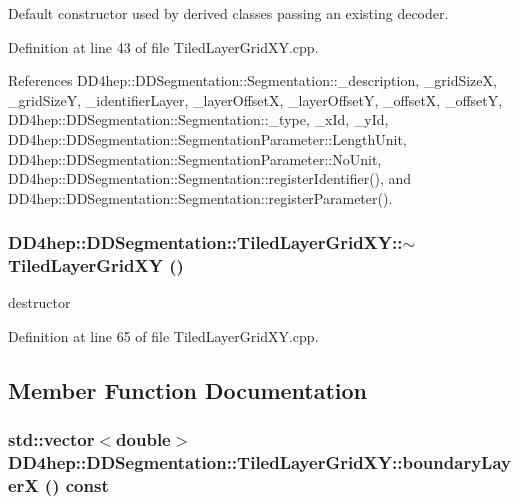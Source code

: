 Default constructor used by derived classes passing an existing decoder. 

Definition at line 43 of file TiledLayerGridXY.cpp.

References DD4hep::DDSegmentation::Segmentation::\_\-description, \_\-gridSizeX, \_\-gridSizeY, \_\-identifierLayer, \_\-layerOffsetX, \_\-layerOffsetY, \_\-offsetX, \_\-offsetY, DD4hep::DDSegmentation::Segmentation::\_\-type, \_\-xId, \_\-yId, DD4hep::DDSegmentation::SegmentationParameter::LengthUnit, DD4hep::DDSegmentation::SegmentationParameter::NoUnit, DD4hep::DDSegmentation::Segmentation::registerIdentifier(), and DD4hep::DDSegmentation::Segmentation::registerParameter().\hypertarget{class_d_d4hep_1_1_d_d_segmentation_1_1_tiled_layer_grid_x_y_a03eeb88ffc324d56f3bfac3abb707e62}{
\subsubsection[{$\sim$TiledLayerGridXY}]{\setlength{\rightskip}{0pt plus 5cm}DD4hep::DDSegmentation::TiledLayerGridXY::$\sim$TiledLayerGridXY ()}}
\label{class_d_d4hep_1_1_d_d_segmentation_1_1_tiled_layer_grid_x_y_a03eeb88ffc324d56f3bfac3abb707e62}


destructor 

Definition at line 65 of file TiledLayerGridXY.cpp.

\subsection{Member Function Documentation}
\hypertarget{class_d_d4hep_1_1_d_d_segmentation_1_1_tiled_layer_grid_x_y_a5302fa68f6d9dde47079504b6ce4608d}{
\subsubsection[{boundaryLayerX}]{\setlength{\rightskip}{0pt plus 5cm}std::vector$<$double$>$ DD4hep::DDSegmentation::TiledLayerGridXY::boundaryLayerX () const}}
\label{class_d_d4hep_1_1_d_d_segmentation_1_1_tiled_layer_grid_x_y_a5302fa68f6d9dde47079504b6ce4608d}


